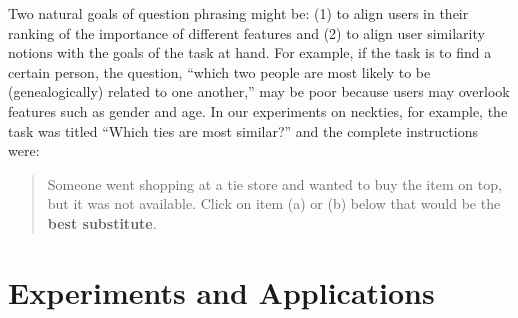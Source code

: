 \documentclass{article}
\begin{document}
Two natural goals of question phrasing might be: (1) to align users in
their ranking of the importance of different features and (2) to align
user similarity notions with the goals of the task at hand.  For
example, if the task is to find a certain person, the question,
``which two people are most likely to be (genealogically) related to
one another,'' may be poor because users may overlook features such as
gender and age.  In our experiments on neckties, for example, the task
was titled ``Which ties are most similar?'' and the complete
instructions were:

\begin{quote}
  Someone went shopping at a tie store and wanted to buy the item on
  top, but it was not available. Click on item (a) or (b) below that
  would be the {\bf best substitute}.
\end{quote}




\section{Experiments and Applications}

\end{document}
